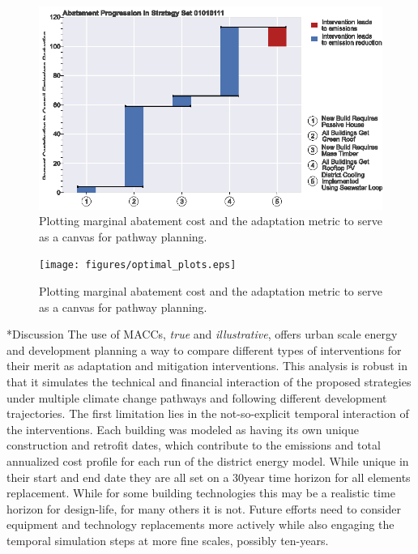 \documentclass[twocolumn, a4paper,10pt]{article}
\makeatletter
\renewcommand\section{\@startsection{section}{1}{\z@}{3pt}{3pt}{\normalfont\large\bfseries}}
\makeatother
\begin{document}
\begin{figure}[hbpt]
    \centering
    \includegraphics[scale=1]{figures/true_macc_DH_waterfall.eps}
    \caption{Plotting marginal abatement cost and the adaptation metric to serve as a canvas for pathway planning.}
    \label{fig:MACC_true_DH_waterfall}
\end{figure}


\begin{figure}[hbpt]
    \centering
    \texttt{[image: figures/optimal\_plots.eps]}
    \caption{Plotting marginal abatement cost and the adaptation metric to serve as a canvas for pathway planning.}
    \label{fig:pareto_plot}
\end{figure}

\section*{Discussion}
The use of MACCs, \textit{true} and \textit{illustrative}, offers urban scale energy and development planning a way to compare different types of interventions for their merit as adaptation and mitigation interventions. This analysis is robust in that it simulates the technical and financial interaction of the proposed strategies under multiple climate change pathways and following different development trajectories. The first limitation lies in the not-so-explicit temporal interaction of the interventions. Each building was modeled as having its own unique construction and retrofit dates, which contribute to the emissions and total annualized cost profile for each run of the district energy model. While unique in their start and end date they are all set on a 30year time horizon for all elements replacement. While for some building technologies this may be a realistic time horizon for design-life, for many others it is not. Future efforts need to consider equipment and technology replacements more actively while also engaging the temporal simulation steps at more fine scales, possibly ten-years. 
\end{document}
